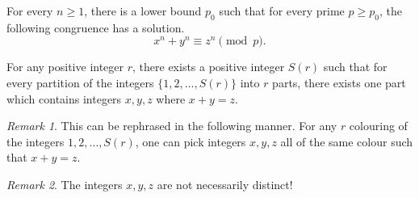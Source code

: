 \documentclass[11pt]{article}
\theoremstyle{definition}
\theoremstyle{remark}
\newtheorem*{remark}{Remark}
\numberwithin{equation}{section}
\begin{document}
    \begin{theorem}
        For every $n \geq 1$, there is a lower bound $p_0$ such that for every prime
        $p \geq p_0$, the following congruence has a solution. \[
            x^n + y^n \equiv z^n \pmod{p}.
        \] 
    \end{theorem}

    \begin{theorem}
        For any positive integer $r$, there exists a positive integer $S(r)$ such
        that for every partition of the integers $\{1, 2, \dots, S(r)\}$ into $r$
        parts, there exists one part which contains integers $x, y, z$ where $x + y =
        z$.
        
        \begin{remark}
            This can be rephrased in the following manner. For any $r$ colouring of
            the integers $1, 2, \dots, S(r)$, one can pick integers $x, y, z$ all of
            the same colour such that $x + y = z$.
        \end{remark}
        \begin{remark}
            The integers $x,y,z$ are not necessarily distinct!
        \end{remark}
    \end{theorem}
\end{document}
